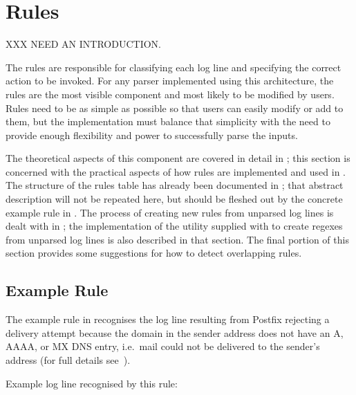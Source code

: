 \section{Rules}

\label{rules in implementation}

XXX NEED AN INTRODUCTION\@.

The rules are responsible for classifying each log line and specifying the
correct action to be invoked.  For any parser implemented using this
architecture, the rules are the most visible component and most likely to
be modified by users.  Rules need to be as simple as possible so that users
can easily modify or add to them, but the implementation must balance that
simplicity with the need to provide enough flexibility and power to
successfully parse the inputs.

The theoretical aspects of this component are covered in detail in
; this section is concerned with the
practical aspects of how rules are implemented and used in \parsername{}.
The structure of the rules table has already been documented in
; that abstract description will not be repeated
here, but should be fleshed out by the concrete example rule in
.  The process of creating new
rules from unparsed log lines is dealt with in ; the implementation of the utility supplied with
\parsername{} to create regexes from unparsed log lines is also described
in that section.  The final portion of this section provides some
suggestions for how to detect overlapping rules.

\subsection{Example Rule}

\label{example rule in implementation}

The example rule in 
recognises the log line resulting from Postfix rejecting a delivery attempt
because the domain in the sender address does not have an A, AAAA,
or MX DNS entry, i.e.\ mail could not be delivered to the sender's address
(for full details see~\cite{reject-unknown-sender-domain}).

Example log line recognised by this rule:


